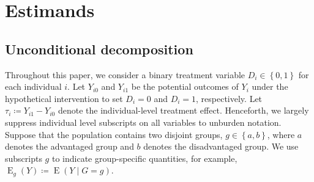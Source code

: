 \documentclass[12pt,a4paper]{article}
\newcommand{\E}{\operatorname{E}}
\begin{document}
\section{Estimands}
\subsection{Unconditional decomposition}
Throughout this paper, we consider a binary treatment variable $D_i \in \left\lbrace 0,1 \right\rbrace$ for each individual $i$. Let $Y_{i0}$ and $Y_{i1}$ be the potential outcomes \citep{rubin_estimating_1974} of $Y_i$ under the hypothetical intervention to set $D_i=0$ and $D_i=1$, respectively. Let $\tau_i \coloneqq Y_{i1} - Y_{i0}$ denote the individual-level treatment effect. Henceforth, we largely suppress individual level subscripts on all variables to unburden notation. Suppose that the population contains two disjoint groups, $g \in \left\lbrace a,b \right\rbrace$, where $a$ denotes the advantaged group and $b$ denotes the disadvantaged group. We use subscripts $g$ to indicate group-specific quantities, for example, $\E_g(Y) \coloneqq \E(Y \mid G=g)$.  
\end{document}
